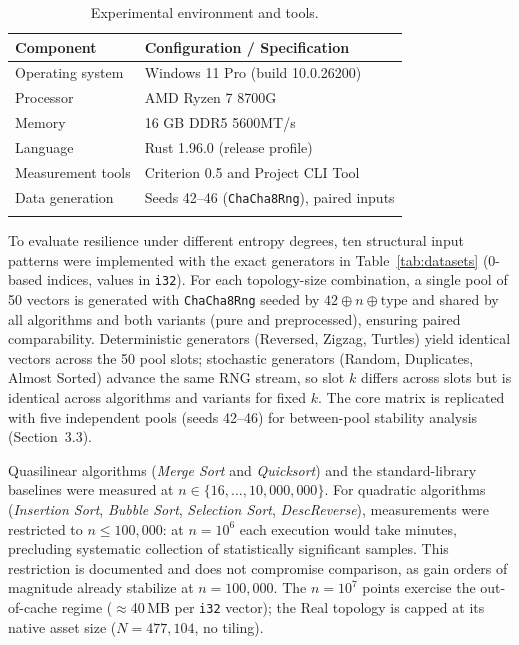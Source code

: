 \documentclass[namedate,webpdf,contemporary,large]{TBench-template}%
\theoremstyle{thmstyleone}%
\theoremstyle{thmstyletwo}%
\theoremstyle{thmstylethree}%
\begin{document}
\begin{table}[!t]
\caption{Experimental environment and tools.\label{tab:environment}}%
\begin{tabular*}{\columnwidth}{@{\extracolsep\fill}ll@{\extracolsep\fill}}
\toprule
Component & Configuration / Specification\\
\midrule
Operating system & Windows 11 Pro (build 10.0.26200)\\
Processor & AMD Ryzen 7 8700G\\
Memory & 16 GB DDR5 5600MT/s\\
Language & Rust 1.96.0 (release profile)\\
Measurement tools & Criterion 0.5 and Project CLI Tool\\
Data generation & Seeds 42--46 (\texttt{ChaCha8Rng}), paired inputs\\
\botrule
\end{tabular*}
\end{table}

To evaluate resilience under different entropy degrees, ten structural input patterns were implemented with the exact generators in Table~\ref{tab:datasets} (0-based indices, values in \texttt{i32}). For each topology-size combination, a single pool of 50 vectors is generated with \texttt{ChaCha8Rng} seeded by $42 \oplus n \oplus \text{type}$ and shared by all algorithms and both variants (pure and preprocessed), ensuring paired comparability. Deterministic generators (Reversed, Zigzag, Turtles) yield identical vectors across the 50 pool slots; stochastic generators (Random, Duplicates, Almost Sorted) advance the same RNG stream, so slot $k$ differs across slots but is identical across algorithms and variants for fixed $k$. The core matrix is replicated with five independent pools (seeds 42--46) for between-pool stability analysis (Section~3.3).

Quasilinear algorithms (\emph{Merge Sort} and \emph{Quicksort}) and the standard-library baselines were measured at $n \in \{16, \ldots, 10{,}000{,}000\}$. For quadratic algorithms (\emph{Insertion Sort}, \emph{Bubble Sort}, \emph{Selection Sort}, \emph{DescReverse}), measurements were restricted to $n \le 100{,}000$: at $n=10^6$ each execution would take minutes, precluding systematic collection of statistically significant samples. This restriction is documented and does not compromise comparison, as gain orders of magnitude already stabilize at $n=100{,}000$. The $n{=}10^7$ points exercise the out-of-cache regime ($\approx$40\,MB per \texttt{i32} vector); the Real topology is capped at its native asset size ($N{=}477{,}104$, no tiling).
\end{document}
